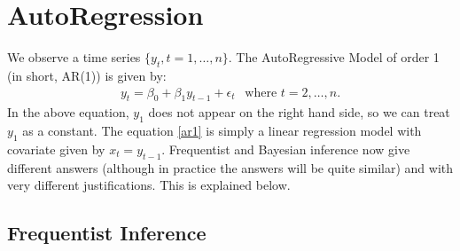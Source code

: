 \documentclass{scrartcl}
\begin{document}
\section{AutoRegression}\label{armods}

We observe a time series $\{y_t, t = 1, \dots, n\}$. The
AutoRegressive Model of order 1 (in short, AR(1)) is given by:
\begin{align}\label{ar1}
  y_t = \beta_0 + \beta_1 y_{t-1} + \epsilon_t ~~\text{ where $t = 2,
  \dots, n$}. 
\end{align}
In the above equation, $y_1$ does not appear on the right hand side,
so we can treat $y_1$ as a constant. The equation \eqref{ar1} is
simply a linear regression model with covariate given by $x_t =
y_{t-1}$. Frequentist and Bayesian inference now give different
answers (although in practice the answers will be quite similar) and
with very different justifications. This is explained below.

\subsection{Frequentist Inference}
\end{document}

